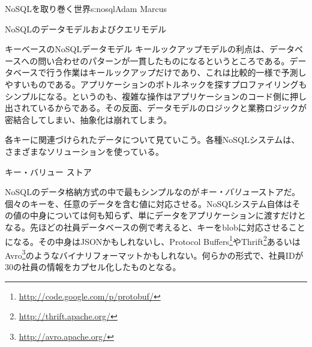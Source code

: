 \begin{aosachapter}{NoSQLを取り巻く世界}{s:nosql}{Adam Marcus}
\begin{aosasect1}{NoSQLのデータモデルおよびクエリモデル}
\begin{aosasect2}{キーベースのNoSQLデータモデル}
キールックアップモデルの利点は、データベースへの問い合わせのパターンが一貫したものになるというところである。データベースで行う作業はキールックアップだけであり、これは比較的一様で予測しやすいものである。アプリケーションのボトルネックを探すプロファイリングもシンプルになる。というのも、複雑な操作はアプリケーションのコード側に押し出されているからである。その反面、データモデルのロジックと業務ロジックが密結合してしまい、抽象化は崩れてしまう。

各キーに関連づけられたデータについて見ていこう。各種NoSQLシステムは、さまざまなソリューションを使っている。

\begin{aosasect3}{キー・バリュー ストア}

NoSQLのデータ格納方式の中で最もシンプルなのが\emph{キー・バリュー}ストアだ。個々のキーを、任意のデータを含む値に対応させる。NoSQLシステム自体はその値の中身については何も知らず、単にデータをアプリケーションに渡すだけとなる。先ほどの社員データベースの例で考えると、キーをblobに対応させることになる。その中身はJSONかもしれないし、Protocol Buffers\footnote{\url{http://code.google.com/p/protobuf/}}やThrift\footnote{\url{http://thrift.apache.org/}}あるいはAvro\footnote{\url{http://avro.apache.org/}}のようなバイナリフォーマットかもしれない。何らかの形式で、社員IDが30の社員の情報をカプセル化したものとなる。


\end{aosasect3}
\end{aosasect2}
\end{aosasect1}
\end{aosachapter}
